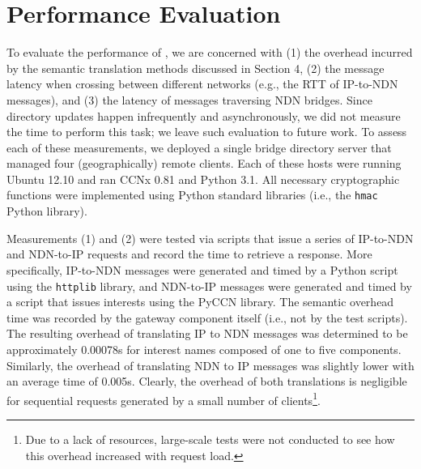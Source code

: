 \section{Performance Evaluation}
To evaluate the performance of \sink, we are concerned with (1) the overhead incurred by the semantic translation methods discussed in Section 4, (2) the message latency when crossing between different networks (e.g., the RTT of IP-to-NDN messages), and (3) the latency of messages traversing NDN bridges. Since directory updates happen infrequently and asynchronously, we did not measure the time to perform this task; we leave such evaluation to future work. To assess each of these measurements, we deployed a single bridge directory server that managed four (geographically) remote clients. Each of these hosts were running Ubuntu 12.10 and ran CCNx 0.81 and Python 3.1. All necessary cryptographic functions were implemented using Python standard libraries (i.e., the {\tt hmac} Python library). 

Measurements (1) and (2) were tested via scripts that issue a series of IP-to-NDN and NDN-to-IP requests and record the time to retrieve a response. More specifically, IP-to-NDN messages were generated and timed by a Python script using the {\tt httplib} library, and NDN-to-IP messages were generated and timed by a script that issues interests using the PyCCN library. The semantic overhead time was recorded by the gateway component itself (i.e., not by the test scripts). The resulting overhead of translating IP to NDN messages was determined to be approximately 0.00078s for interest names composed of one to five components. Similarly, the overhead of translating NDN to IP messages was slightly lower with an average time of 0.005s. Clearly, the overhead of both translations is negligible for sequential requests generated by a small number of clients\footnote{Due to a lack of resources, large-scale tests were not conducted to see how this overhead increased with request load.}. 


